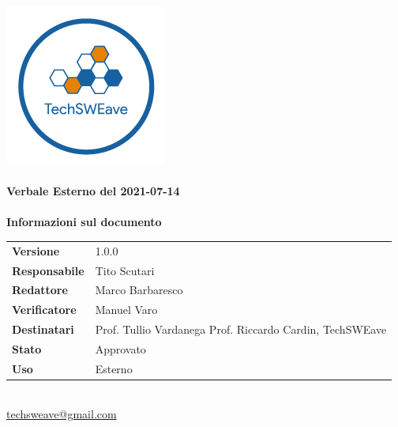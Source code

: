 \documentclass[a4paper]{article}
\begin{document}
\begin{titlepage}
    \begin{center}
        \includegraphics{../../../../Images/logo.png}\\
        \vspace{20px}
        \textcolor{logo}{\hrulefill}\\
        \vspace{20px}
        \textbf{\huge\textcolor{logo}{Verbale Esterno del 2021-07-14}}\\
        \vspace{10px}
        \textcolor{logo}{\hrulefill}\\
        \vspace{40px}
        \textbf{\Large Informazioni sul documento}\\
        \vspace{20px}
        \begin{tabular}{p{100px} | p{100px}}
            \textbf{Versione}     & 1.0.0                                                                      \\
            \textbf{Responsabile} & Tito Scutari                                                               \\
            \textbf{Redattore}    & Marco Barbaresco                                                           \\
            \textbf{Verificatore} & Manuel Varo                                                                \\
            \textbf{Destinatari}  & Prof. Tullio Vardanega \newline Prof. Riccardo Cardin, \newline TechSWEave \\
            \textbf{Stato}        & Approvato                                                                  \\
            \textbf{Uso}          & Esterno                                                                    \\
        \end{tabular}\\
        \vspace{60px}
        \href{mailto:techsweave@gmail.com}{techsweave@gmail.com}\\

    \end{center}
\end{titlepage}
\end{document}
